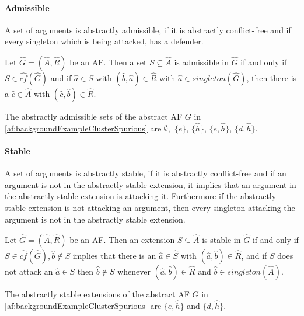 \paragraph{Admissible} A set of arguments is abstractly admissible, if it is abstractly conflict-free and if every singleton which is being attacked, has a defender.

\begin{definition}
    Let $\hat{G}=(\hat{A},\hat{R})$ be an AF. Then a set  $S \subseteq \hat{A}$ is admissible in $\hat{G}$ if and only if $S \in \hat{cf}(\hat{G})$ and if $\hat{a} \in S$ with $(\hat{b}, \hat{a}) \in \hat{R}$ with $\hat{a} \in singleton(\hat{G})$, then there is a $\hat{c} \in \hat{A}$ with $(\hat{c}, \hat{b}) \in \hat{R}$.
\end{definition}
\begin{example}
    The abstractly admissible sets of the abstract AF $G$ in \cref{af:backgroundExampleClusterSpurious} are $\emptyset,$
    $\{e\}$,
    $\{\hat{h}\}$,
    $\{e, \hat{h}\}$,
    $\{d, \hat{h}\}$.
\end{example}





\paragraph{Stable} A set of arguments is abstractly stable, if it is abstractly conflict-free and if an argument is not in the abstractly stable extension, it implies that an argument in the abstractly stable extension is attacking it. Furthermore if the abstractly stable extension is not attacking an argument, then every singleton attacking the argument is not in the abstractly stable extension.

\begin{definition}
    Let $\hat{G}=(\hat{A},\hat{R})$ be an AF. Then an extension $S \subseteq \hat{A}$ is stable in $\hat{G}$ if and only if $S \in \hat{cf}(\hat{G}), \hat{b} \not\in S$ implies that there is an $\hat{a} \in \hat{S}$ with $(\hat{a}, \hat{b}) \in \hat{R}$, and if $S$ does not attack an $\hat{a} \in S$ then $\hat{b} \not\in S$ whenever $(\hat{a}, \hat{b}) \in \hat{R}$ and $\hat{b} \in singleton(\hat{A})$.
\end{definition}


\begin{example}
    The abstractly stable extensions of the abstract AF $G$ in \cref{af:backgroundExampleClusterSpurious} are
    $\{e, \hat{h}\}$ and $\{d, \hat{h}\}$.
\end{example}


